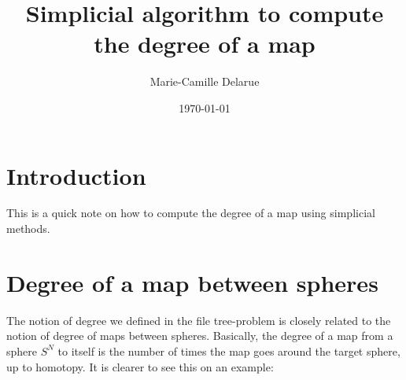 \documentclass[12pt]{amsart}
\title{Simplicial algorithm to compute the degree of a map}
\author{Marie-Camille Delarue}
\date{\today}
\theoremstyle{plain}
\theoremstyle{definition}
\theoremstyle{remark}
\begin{document}
\maketitle
\tableofcontents

\section{Introduction}
This is a quick note on how to compute the degree of a map using simplicial methods.

\section{Degree of a map between spheres}
The notion of degree we defined in the file tree-problem is closely related 
to the notion of degree of maps between spheres.
Basically, the degree of a map from a sphere $S^N$ to itself is the number of times 
the map goes around the target sphere, up to homotopy.
It is clearer to see this on an example:
\end{document}
